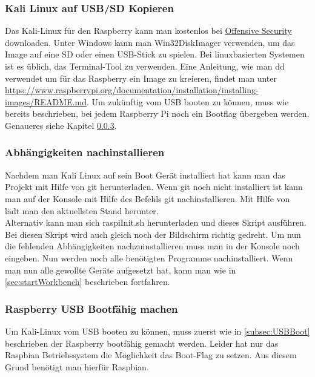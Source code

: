 \subsubsection{Kali Linux auf USB/SD Kopieren}
Das Kali-Linux für den Raspberry kann man kostenlos bei \href{https://www.offensive-security.com/kali-linux-arm-images/}{Offensive Security} downloaden. Unter Windows kann man Win32DiskImager verwenden, um das Image auf eine SD oder einen USB-Stick zu spielen. Bei linuxbasierten Systemen ist es üblich, das Terminal-Tool  zu verwenden. Eine Anleitung, wie man dd verwendet um für das Raspberry ein Image zu kreieren, findet man unter \href{https://www.raspberrypi.org/documentation/installation/installing-images/README.md}{https://www.raspberrypi.org/documentation/installation/installing-images/README.md}. Um zukünftig vom USB booten zu können, muss wie bereits beschrieben, bei jedem Raspberry Pi noch ein Bootflag  übergeben werden. Genaueres siehe Kapitel \ref{subsec:USBBootKali}. 

\subsubsection{Abhängigkeiten nachinstallieren}
Nachdem man Kali Linux auf sein Boot Gerät installiert hat kann man das Projekt mit Hilfe von git herunterladen. Wenn git noch nicht installiert ist kann man auf der Konsole mit Hilfe des Befehls  git nachinstallieren. Mit Hilfe von\\ 
lädt man den aktuellsten Stand herunter.\\
Alternativ kann man sich raspiInit.sh herunterladen und dieses Skript ausführen. Bei diesen Skript wird auch gleich noch der Bildschirm richtig gedreht.
Um nun die fehlenden Abhängigkeiten nachzuinstallieren muss man in der Konsole noch\\
\linebreak
{}
eingeben. Nun werden noch alle benötigten Programme nachinstalliert. Wenn man nun alle gewollte Geräte aufgesetzt hat, kann man wie in \ref{sec:startWorkbench} beschrieben fortfahren.

\subsubsection{Raspberry USB Bootfähig machen}
\label{subsec:USBBootKali}
Um Kali-Linux vom USB booten zu können, muss zuerst wie in \ref{subsec:USBBoot} beschrieben der Raspberry bootfähig gemacht werden. %
Leider hat nur das Raspbian Betriebssystem die Möglichkeit das Boot-Flag zu setzen. Aus diesem Grund benötigt man hierfür Raspbian.

